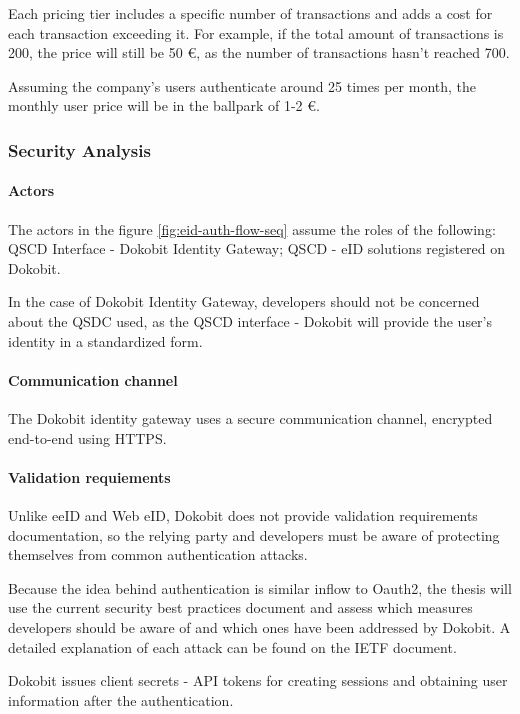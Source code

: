 Each pricing tier includes a specific number of transactions and adds a cost for each transaction exceeding it. For example, if the total amount of transactions is 200, the price will still be 50 €, as the number of transactions hasn't reached 700.

Assuming the company's users authenticate around 25 times per month, the monthly user price will be in the ballpark of 1-2 €.

\subsubsection{Security Analysis}

\paragraph{Actors}

The actors in the figure \ref{fig:eid-auth-flow-seq} assume the roles of the following: QSCD Interface - Dokobit Identity Gateway; QSCD - eID solutions registered on Dokobit.

In the case of Dokobit Identity Gateway, developers should not be concerned about the QSDC used, as the QSCD interface - Dokobit will provide the user's identity in a standardized form.

\paragraph{Communication channel}

The Dokobit identity gateway uses a secure communication channel, encrypted end-to-end using HTTPS.

\paragraph{Validation requiements}

Unlike eeID and Web eID, Dokobit does not provide validation requirements documentation, so the relying party and developers must be aware of protecting themselves from common authentication attacks.

Because the idea behind authentication is similar inflow to Oauth2, the thesis will use the current security best practices document \cite{ietf-oauth-security-topics-19} and assess which measures developers should be aware of and which ones have been addressed by Dokobit. A detailed explanation of each attack can be found on the IETF document.

Dokobit issues client secrets - API tokens for creating sessions and obtaining user information after the authentication.

